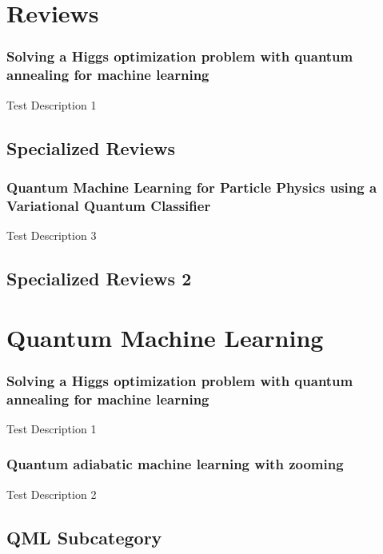\section{Reviews}

\subsubsection{Solving a Higgs optimization problem with quantum annealing for machine learning~\cite{Mott:2017xdb}}
Test Description 1


\subsection{Specialized Reviews}

\subsubsection{Quantum Machine Learning for Particle Physics using a Variational Quantum Classifier~\cite{Blance:2020nhl}}
Test Description 3


\subsection{Specialized Reviews 2}



\section{Quantum Machine Learning}

\subsubsection{Solving a Higgs optimization problem with quantum annealing for machine learning~\cite{Mott:2017xdb}}
Test Description 1
\subsubsection{Quantum adiabatic machine learning with zooming~\cite{Zlokapa:2019lvv}}
Test Description 2


\subsection{QML Subcategory}



